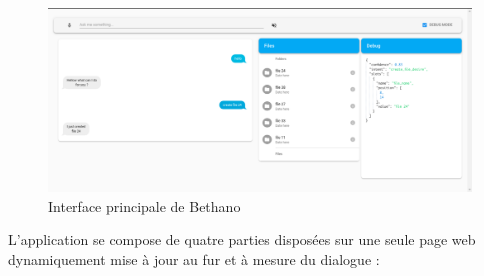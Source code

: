 \begin{figure}[H]
	\centering
	\includegraphics[width=.8\linewidth]{images/Realisation/app_wiss.png} 
	\caption{Interface principale de Bethano}
\end{figure} 

\par 
L'application se compose de quatre parties disposées sur une seule page web dynamiquement mise à jour au fur et à mesure du dialogue :

